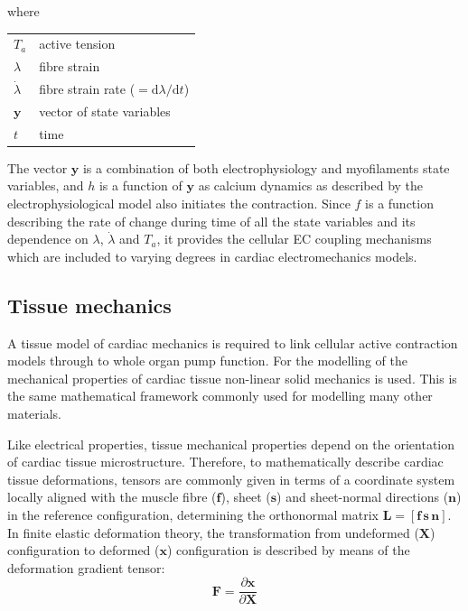 \noindent
where

\vspace{0.2cm}
\begin{tabular}{ll}
    $T_a$           & active tension \\
    $\lambda$       & fibre strain \\
    $\dot{\lambda}$ & fibre strain rate ($=\mathrm{d}\lambda / \mathrm{d}t$) \\
    $\mathbf{y}$    & vector of state variables \\
    $t$             & time
\end{tabular}

\vspace{0.5cm}
\noindent
The vector $\mathbf{y}$ is a combination of both electrophysiology and myofilaments state variables, and $h$ is a function of $\mathbf{y}$ as calcium dynamics as described by the electrophysiological model also initiates the contraction. Since $f$ is a function describing the rate of change during time of all the state variables and its dependence on $\lambda$, $\dot{\lambda}$ and $T_a$, it provides the cellular EC coupling mechanisms which are included to varying degrees in cardiac electromechanics models.


%
%
%
\subsection{Tissue mechanics}\label{sec:tissue_mech_math_modelling}
A tissue model of cardiac mechanics is required to link cellular active contraction models through to whole organ pump function. For the modelling of the mechanical properties of cardiac tissue non-linear solid mechanics is used. This is the same mathematical framework commonly used for modelling many other materials.

\vspace{0.2cm}
Like electrical properties, tissue mechanical properties depend on the orientation of cardiac tissue microstructure. Therefore, to mathematically describe cardiac tissue deformations, tensors are commonly given in terms of a coordinate system locally aligned with the muscle fibre ($\mathbf{f}$), sheet ($\mathbf{s}$) and sheet-normal directions ($\mathbf{n}$) in the reference configuration, determining the orthonormal matrix $\mathbf{L} = [\mathbf{f}\,\mathbf{s}\,\mathbf{n}]$. In finite elastic deformation theory, the transformation from undeformed ($\mathbf{X}$) configuration to deformed ($\mathbf{x}$) configuration is described by means of the deformation gradient tensor:
%
\begin{equation}
    \mathbf{F} = \frac{\partial \mathbf{x}}{\partial\mathbf{X}}
\end{equation}

